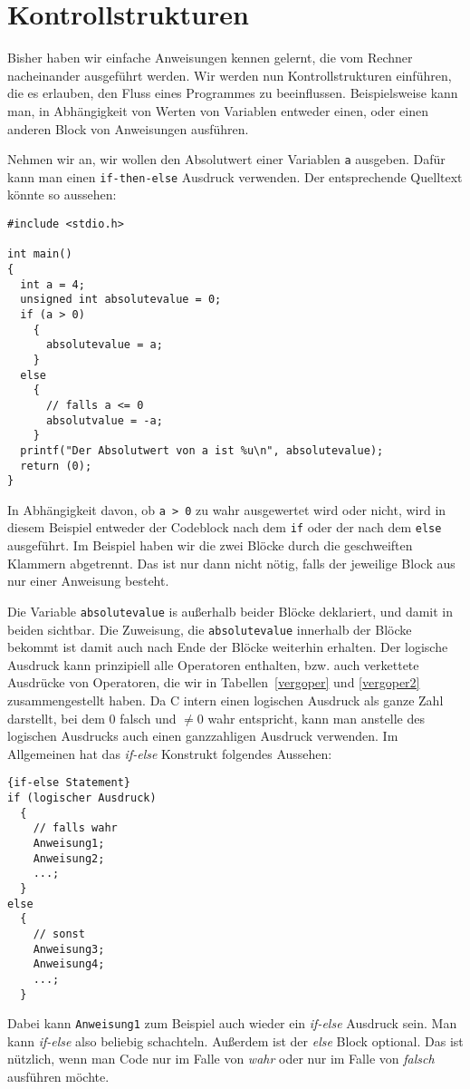 \section{Kontrollstrukturen}

Bisher haben wir einfache Anweisungen kennen gelernt, die vom Rechner nacheinander ausgeführt werden.
Wir werden nun Kontrollstrukturen einführen, die es erlauben, den Fluss eines Programmes zu beeinflussen.
Beispielsweise kann man, in Abhängigkeit von Werten von Variablen entweder einen, oder einen anderen Block von Anweisungen ausführen.

Nehmen wir an, wir wollen den Absolutwert einer Variablen \verb|a| ausgeben.
Dafür kann man einen \verb|if-then-else| Ausdruck verwenden.
Der entsprechende Quelltext könnte so aussehen:
\begin{lstlisting}
#include <stdio.h>

int main()
{
  int a = 4;
  unsigned int absolutevalue = 0;
  if (a > 0)
    {
      absolutevalue = a;
    }
  else
    {
      // falls a <= 0
      absolutvalue = -a;
    }
  printf("Der Absolutwert von a ist %u\n", absolutevalue);
  return (0);
}
\end{lstlisting}
In Abhängigkeit davon, ob \verb|a > 0| zu wahr ausgewertet wird oder nicht, wird in diesem Beispiel entweder der Codeblock nach dem \verb|if| oder der nach dem \verb|else| ausgeführt.
Im Beispiel haben wir die zwei Blöcke durch die geschweiften Klammern abgetrennt. 
Das ist nur dann nicht nötig, falls der jeweilige Block aus nur einer Anweisung besteht.

Die Variable \verb|absolutevalue| is außerhalb beider Blöcke deklariert, und damit in beiden sichtbar.
Die Zuweisung, die \verb|absolutevalue| innerhalb der Blöcke bekommt ist damit auch nach Ende der Blöcke weiterhin erhalten.
Der logische Ausdruck kann prinzipiell alle Operatoren enthalten, bzw. auch verkettete Ausdrücke von Operatoren, die wir in Tabellen~\ref{vergoper} und \ref{vergoper2} zusammengestellt haben.
Da C intern einen logischen Ausdruck als ganze Zahl darstellt, bei dem $0$ falsch und $\neq 0$ wahr entspricht, kann man anstelle des logischen Ausdrucks auch einen ganzzahligen Ausdruck verwenden.
Im Allgemeinen hat das \emph{if-else} Konstrukt folgendes Aussehen:
\begin{lstlisting}{if-else Statement}
if (logischer Ausdruck)
  {
    // falls wahr
    Anweisung1;
    Anweisung2;
    ...;
  }
else
  {
    // sonst
    Anweisung3;
    Anweisung4;
    ...;
  }
\end{lstlisting}
Dabei kann \verb|Anweisung1| zum Beispiel auch wieder ein \emph{if-else} Ausdruck sein. 
Man kann \emph{if-else} also beliebig schachteln.
Außerdem ist der \emph{else} Block optional.
Das ist nützlich, wenn man Code nur im Falle von \emph{wahr} oder nur im Falle von \emph{falsch} ausführen möchte.

